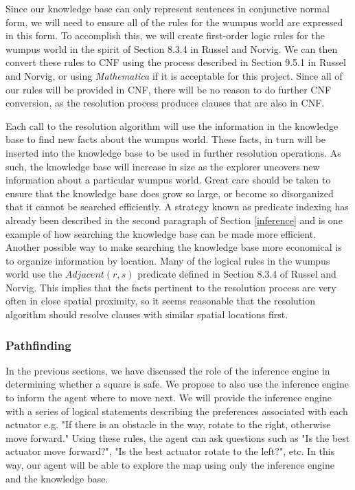 \documentclass{article}
\begin{document}
				Since our knowledge base can only represent sentences in conjunctive normal form, we will need to ensure all of the rules for the wumpus world are expressed in this form.
				To accomplish this, we will create first-order logic rules for the wumpus world in the spirit of Section 8.3.4 in Russel and Norvig.
				We can then convert these rules to CNF using the process described in Section 9.5.1 in Russel and Norvig, or using \textit{Mathematica} if it is acceptable for this project.
				Since all of our rules will be provided in CNF, there will be no reason to do further CNF conversion, as the resolution process produces clauses that are also in CNF.
				
				Each call to the resolution algorithm will use the information in the knowledge base to find new facts about the wumpus world.
				These facts, in turn will be inserted into the knowledge base to be used in further resolution operations.
				As such, the knowledge base will increase in size as the explorer uncovers new information about a particular wumpus world.
				Great care should be taken to ensure that the knowledge base does grow so large, or become so disorganized that it cannot be searched efficiently.
				A strategy known as predicate indexing has already been described in the second paragraph of Section \ref{inference} and is one example of how searching the knowledge base can be made more efficient.
				Another possible way to make searching the knowledge base more economical is to organize information by location.
				Many of the logical rules in the wumpus world use the $Adjacent(r,s)$ predicate defined in Section 8.3.4 of Russel and Norvig.
				This implies that the facts pertinent to the resolution process are very often in close spatial proximity, so it seems reasonable that the resolution algorithm should resolve clauses with similar spatial locations first.
			
			
			\subsubsection{Pathfinding}
			
				In the previous sections, we have discussed the role of the inference engine in determining whether a square is safe. We propose to also use the inference engine to inform the agent where to move next.
				We will provide the inference engine with a series of logical statements describing the preferences associated with each actuator e.g. "If there is an obstacle in the way, rotate to the right, otherwise move forward." Using these rules, the agent can ask questions such as "Is the best actuator move forward?", "Is the best actuator rotate to the left?", etc. In this way, our agent will be able to explore the map using only the inference engine and the knowledge base.
			
\end{document}
